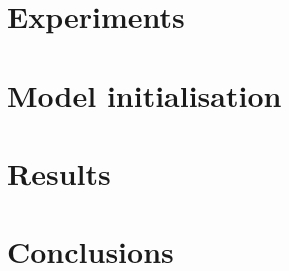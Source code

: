\documentclass[11pt]{book}
\begin{document}
\chapter{Experiments}


\chapter{Model initialisation}


\chapter{Results}


\chapter{Conclusions}


 

\end{document}
